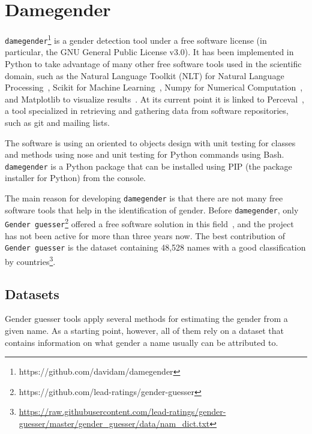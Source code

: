 \documentclass[a4paper]{article}
\begin{document}


\section{Damegender}

\texttt{damegender}\footnote{https://github.com/davidam/damegender} is a gender detection tool under a free software license (in particular, the GNU General Public License v3.0). 
It has been implemented in Python to take advantage of many other free software tools used in the scientific domain, such as the Natural Language Toolkit (NLT) for Natural Language Processing~\cite{loper2002nltk}, Scikit for Machine Learning~\cite{pedregosa2011scikit}, Numpy for Numerical Computation~\cite{van2011numpy}, and Matplotlib to visualize results~\cite{hunter2007matplotlib}. 
At its current point it is linked to Perceval~\cite{duenas2018perceval}, a tool specialized in retrieving and gathering data from software repositories, such as git and mailing lists.

The software is using an oriented to objects design with unit testing for classes and methods using nose and unit testing for Python commands using Bash. 
\texttt{damegender} is a Python package that can be installed using PIP (the package installer for Python) from the console.

The main reason for developing \texttt{damegender} is that there are not many free software tools that help in the identification of gender. Before \texttt{damegender}, only \texttt{Gender guesser}\footnote{https://github.com/lead-ratings/gender-guesser} offered a free software solution in this field~\cite{krawetz2006gender}, and the project has not been active for more than three years now.
The best contribution of \texttt{Gender guesser} is the dataset containing 48,528 names with a good classification by countries\footnote{\url{https://raw.githubusercontent.com/lead-ratings/gender-guesser/master/gender_guesser/data/nam_dict.txt}}.

\subsection{Datasets}

Gender guesser tools apply several methods for estimating the gender from a given name. 
As a starting point, however, all of them rely on a dataset that contains information on what gender a name usually can be attributed to.
\end{document}
